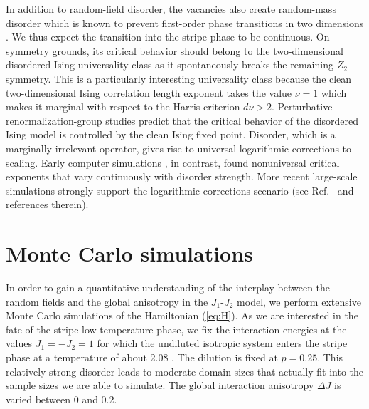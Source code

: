 \documentclass[twocolumn,showpacs,superscriptaddress,aps,prb]{revtex4-2}
\begin{document}
In addition to random-field disorder, the vacancies also create random-mass disorder which is
known to prevent first-order phase transitions in two dimensions \cite{ImryWortis79,HuiBerker89,AizenmanWehr89}.
We thus expect the transition into the stripe phase to be continuous. On symmetry grounds, its critical behavior
should belong to the two-dimensional
disordered Ising universality class as it spontaneously breaks the remaining $Z_2$ symmetry.
This is a particularly interesting universality
class because the clean two-dimensional Ising correlation length exponent takes the value $\nu=1$ which
makes it marginal with respect to the Harris criterion \cite{Harris74} $d\nu > 2$.
Perturbative renormalization-group studies \cite{DotsenkoDotsenko83,Shalaev84,Shankar87}
predict that the critical behavior of the disordered Ising model is controlled by the clean
Ising fixed point. Disorder, which is a marginally irrelevant operator, gives rise to universal
logarithmic corrections to scaling. Early computer simulations \cite{FahnleHoleyEckert92,KimPatrascioiu94,Kuhn94},
in contrast, found nonuniversal critical exponents that vary continuously with disorder strength.
More recent large-scale simulations strongly support the logarithmic-corrections scenario
(see Ref.\ \cite{ZWNHV15} and references therein).


\section{Monte Carlo simulations}
\label{sec:MC}

In order to gain a quantitative understanding of the interplay between the random fields and the
global anisotropy in the $J_1$-$J_2$ model, we perform extensive Monte Carlo simulations of the
Hamiltonian (\ref{eq:H}). As we are interested in the fate of the stripe low-temperature
phase, we fix the interaction energies at the values $J_1=-J_2=1$ for which
the undiluted isotropic system enters the stripe phase at a temperature of about 2.08
\cite{KalzHoneckerMoliner11}.
The dilution is fixed at $p=0.25$. This relatively strong disorder leads to moderate domain
sizes that actually fit into the sample sizes we are able to simulate. The global
interaction anisotropy $\Delta J$ is varied between 0 and 0.2.
\end{document}
